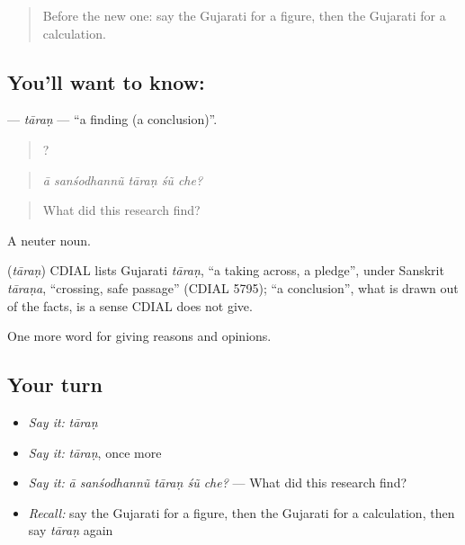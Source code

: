 \label{lesson:GU-C363-taran}



\begin{quote}
Before the new one: say the Gujarati for a figure, then the Gujarati for a calculation.
\end{quote}

\subsection*{You'll want to know: }
\textbf{} — \emph{tāraṇ} — \textquotedblleft{}a finding (a conclusion)\textquotedblright{}.

\begin{quote}
    ?
\end{quote}

\begin{quote}
\emph{ā sanśodhannũ tāraṇ śũ che?}
\end{quote}

\begin{quote}
What did this research find?
\end{quote}

A neuter noun.

\begin{cousinweb}
\textbf{} (\emph{tāraṇ}) CDIAL lists Gujarati \emph{tāraṇ}, \textquotedblleft{}a taking across, a pledge\textquotedblright{}, under Sanskrit \emph{tāraṇa}, \textquotedblleft{}crossing, safe passage\textquotedblright{} (CDIAL 5795); \textquotedblleft{}a conclusion\textquotedblright{}, what is drawn out of the facts, is a sense CDIAL does not give.
\end{cousinweb}

\begin{grammarlens}[title={What you've built}]
One more word for giving reasons and opinions.
\end{grammarlens}

\subsection*{Your turn}
\begin{itemize}
\raggedright
  \item \emph{Say it:} \emph{tāraṇ}
  \item \emph{Say it:} \emph{tāraṇ}, once more
  \item \emph{Say it:} \emph{ā sanśodhannũ tāraṇ śũ che?} — What did this research find?
  \item \emph{Recall:} say the Gujarati for a figure, then the Gujarati for a calculation, then say \emph{tāraṇ} again
\end{itemize}

